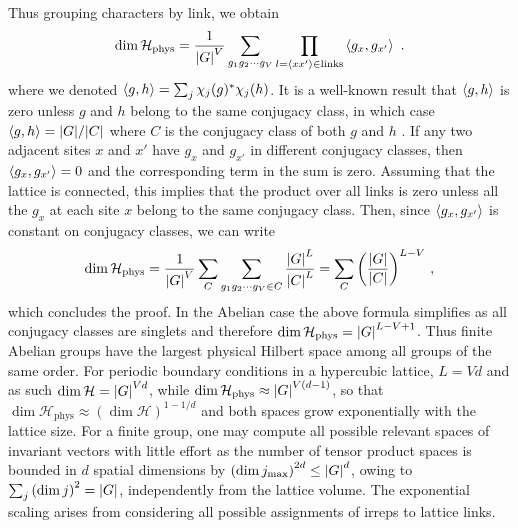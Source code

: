 Thus grouping characters by link, we obtain
\begin{equation}
    \dim{\mathcal{H}_{\mathrm{phys}}} =\frac{1}{\abs{G}^V} \sum_{g_1 g_2 \cdots g_V} \prod_{l = \expval{xx'} \in \mathrm{links}} \expval{g_x, g_{x'}} \ .
\end{equation}
where we denoted $\expval{g, h} = \sum_j \chi_j(g)^* \chi_j(h)$.
It is a well-known result that $\expval{g, h}$ is zero unless $g$ and $h$ belong to the same conjugacy class, in which case $\expval{g, h} = \abs{G} / \abs{C}$ where $C$ is the conjugacy class of both $g$ and $h$ \cite{Serre}.
If any two adjacent sites $x$ and $x'$ have $g_x$ and $g_{x'}$ in different conjugacy classes, then $\expval{g_x, g_{x'}}=0$ and the corresponding term in the sum is zero.
Assuming that the lattice is connected, this implies that the product over all links is zero unless all the $g_x$ at each site $x$ belong to the same conjugacy class.
Then, since $\expval{g_x, g_{x'}}$ is constant on conjugacy classes, we can write
\begin{equation}
    \dim{\mathcal{H}_{\mathrm{phys}}}
    =\frac{1}{\abs{G}^V} \sum_C \sum_{g_1 g_2 \cdots g_V \in C} \frac{\abs{G}^L}{\abs{C}^L} = \sum_C  \pqty{\frac{\abs{G}}{\abs{C}}}^{L-V} \ ,
\end{equation}
which concludes the proof.
In the Abelian case the above formula simplifies as all conjugacy classes are singlets and therefore $\dim{\mathcal{H}_{\mathrm{phys}}} = \abs{G}^{L-V+1}$.
Thus finite Abelian groups have the largest physical Hilbert space among all groups of the same order.
For periodic boundary conditions in a hypercubic lattice, $L=Vd$ and as such $\dim{\mathcal{H}}=\abs{G}^{Vd}$, while $\dim{\mathcal{H}_{\mathrm{phys}}} \approx \abs{G}^{V (d-1)}$, so that $\dim{\mathcal{H}_{\mathrm{phys}}} \approx (\dim{\mathcal{H}})^{1-1/d}$ and both spaces grow exponentially with the lattice size.
For a finite group, one may compute all possible relevant spaces of invariant vectors with little effort as the number of tensor product spaces is bounded in $d$ spatial dimensions by $\pqty{\dim{j}_\mathrm{max}}^{2d} \leq \abs{G}^d$, owing to $\sum_j \pqty{\dim{j}}^2 = \abs{G}$, independently from the lattice volume.
The exponential scaling arises from considering all possible assignments of irreps to lattice links.

